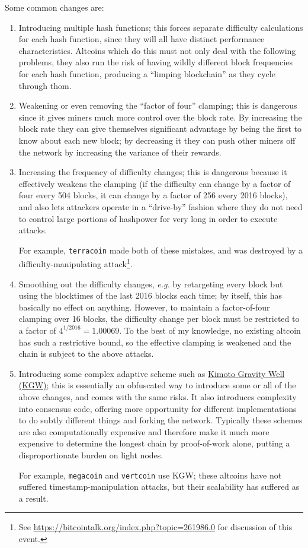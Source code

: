 \documentclass[letterpaper]{article}
\begin{document}
Some common changes are:
\begin{enumerate}
\item Introducing multiple hash functions; this forces separate difficulty calculations
for each hash function, since they will all have distinct performance characteristics.
Altcoins which do this must not only deal with the following problems, they also run
the risk of having wildly different block frequencies for each hash function, producing
a ``limping blockchain'' as they cycle through thom.

\item Weakening or even removing the ``factor of four'' clamping; this is dangerous
since it gives miners much more control over the block rate. By increasing the block
rate they can give themselves significant advantage by being the first to know about
each new block; by decreasing it they can push other miners off the network by
increasing the variance of their rewards.

\item Increasing the frequency of difficulty changes; this is dangerous because it
effectively weakens the clamping (if the difficulty can change by a factor of four
every 504 blocks, it can change by a factor of 256 every 2016 blocks), and also lets
attackers operate in a ``drive-by'' fashion where they do not need to control large
portions of hashpower for very long in order to execute attacks.

For example, \texttt{terracoin} made both of these mistakes, and was destroyed by a
difficulty-manipulating attack\footnote{See \url{https://bitcointalk.org/index.php?topic=261986.0}
for discussion of this event.}.

\item Smoothing out the difficulty changes, \emph{e.g.} by retargeting every block
but using the blocktimes of the last 2016 blocks each time; by itself, this has
basically no effect on anything. However, to maintain a factor-of-four clamping
over 16 blocks, the difficulty change per block must be restricted to a factor of
$4^{1/2016} = 1.00069$. To the best of my knowledge, no existing altcoin has such
a restrictive bound, so the effective clamping is weakened and the chain is subject
to the above attacks.

\item Introducing some complex adaptive scheme such as
\href{https://bitcoin.stackexchange.com/questions/21730/how-does-the-kimoto-gravity-well-regulate-difficulty}
{Kimoto Gravity Well (KGW)}; this is essentially an obfuscated way to introduce some or
all of the above changes, and comes with the same risks. It also introduces complexity
into consensus code, offering more opportunity for different implementations to do
subtly different things and forking the network. Typically these schemes are also
computationally expensive and therefore make it much more expensive to determine the
longest chain by proof-of-work alone, putting a disproportionate burden on light
nodes.

For example, \texttt{megacoin} and \texttt{vertcoin} use KGW; these altcoins have not
suffered timestamp-manipulation attacks, but their scalability has suffered as a result.
\end{enumerate}
\end{document}
